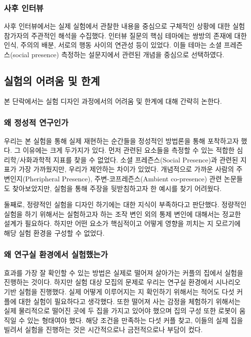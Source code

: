 \subsubsection{사후 인터뷰}

사후 인터뷰에서는 실제 실험에서 관찰한 내용을 중심으로 구체적인 상황에 대한 실험 참가자의 주관적인 해석을 수집했다. 인터뷰 질문의 핵심 테마에는 쌍방의 존재에 대한 인식, 주의의 배분, 서로의 행동 사이의 연관성 등이 있었다. 이들 테마는 소셜 프레즌스(social presence) 측정하는 설문지\cite{biocca2001networked}에서  관련된 개념을 중심으로 선택하였다.


\subsection{실험의 어려움 및 한계}


본 단락에서는 실험 디자인 과정에서의 어려움 및 한계에 대해 간략히 논한다.

\subsubsection{왜 정성적 연구인가}

우리는 본 실험을 통해 \sysname\이 실제 \concept\를 재현하는 순간들을 정성적인 방법론을 통해 포착하고자 했다. 그 이유에는 크게 두가지가 있다. 먼저  관련된 요소들을 측정할 수 있는 적합한 심리학/사화과학적 지표를 찾을 수 없었다. 소셜 프레즌스(Social Presence)과 관련된 지표\cite{biocca2001networked}가 가장 가까웠지만, 우리가 제안하는  차이가 있었다. 개념적으로 가까운 사람의 주변인지(Pheripheral Presence), 주변-코프레즌스(Ambient co-presence) 관련 논문들도 찾아보았지만, 실험을 통해 주장을 뒷받침하고자 한 예시를 찾기 어려웠다.

둘째로, 정량적인 실험을 디자인 하기에는  대한 지식이 부족하다고 판단했다. 정량적인 실험을 하기 위해서는 실험하고자 하는 조작 변인 외의 통제 변인에 대해서는 정교한 설계가 필요하다. 하지만 어떤 요소가 핵심적이고  어떻게 영향을 끼치는 지 모르기에 해당 실험 환경을 구성할 수 없었다.


\subsubsection{왜 연구실 환경에서 실험했는가}

 효과를 가장 잘 확인할 수 있는 방법은 실제로 떨어져 살아가는 커플의 집에서 실험을 진행하는 것이다. 하지만 실험 대상 모집의 문제로 우리는 연구실 환경에서 시나리오 기반 실험을 진행했다. 실제 \concept\가 어떻게 이루어지는 지 확인하기 위해서는 적어도 다섯 커플에 대한 실험이 필요하다고 생각했다. 또한 떨어져 사는 감정을 체험하기 위해서는 실제 물리적으로 떨어진 곳에 두 집을 가지고 있어야 했으며 집의 구성 또한 로봇이 움직일 수 있는 형태여야 했다. 해당 조건을 만족하는 다섯 커플 찾고, 이들의 실제 집을 빌려서 실험을 진행하는 것은 시간적으로나 금전적으로나 부담이 컸다.

